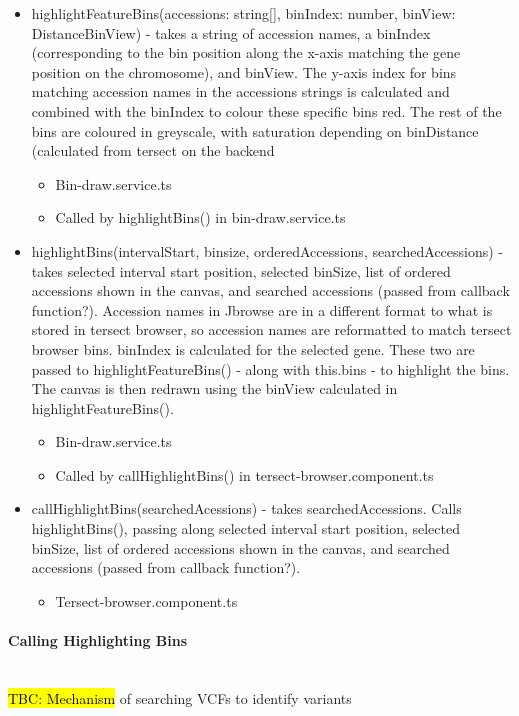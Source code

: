 \documentclass[12pt]{article}
\begin{document}
\begin{itemize}
    \item highlightFeatureBins(accessions: string[], binIndex: number, binView: DistanceBinView) - takes a string of accession names, a binIndex (corresponding to the bin position along the x-axis matching the gene position on the chromosome), and binView. The y-axis index for bins matching accession names in the accessions strings is calculated and combined with the binIndex to colour these specific bins red. The rest of the bins are coloured in greyscale, with saturation depending on binDistance (calculated from tersect on the backend 
    \begin{itemize}
        \item Bin-draw.service.ts 
        \item Called by highlightBins() in bin-draw.service.ts 
    \end{itemize}
    \item highlightBins(intervalStart, binsize, orderedAccessions, searchedAccessions) - takes selected interval start position, selected binSize, list of ordered accessions shown in the canvas, and searched accessions (passed from callback function?). Accession names in Jbrowse are in a different format to what is stored in tersect browser, so accession names are reformatted to match tersect browser bins. binIndex is calculated for the selected gene. These two are passed to highlightFeatureBins() - along with this.bins - to highlight the bins. The canvas is then redrawn using the binView calculated in highlightFeatureBins(). 
    \begin{itemize}
        \item Bin-draw.service.ts 
        \item Called by callHighlightBins() in tersect-browser.component.ts 
    \end{itemize}
    \item callHighlightBins(searchedAcessions) - takes searchedAccessions. Calls highlightBins(), passing along  selected interval start position, selected binSize, list of ordered accessions shown in the canvas, and searched accessions (passed from callback function?). 
    \begin{itemize}
        \item Tersect-browser.component.ts 
    \end{itemize}
\end{itemize}
 
\paragraph{Calling Highlighting Bins} \mbox{}
\\
\hl{TBC: Mechanism} of searching VCFs to identify variants 
\end{document}
